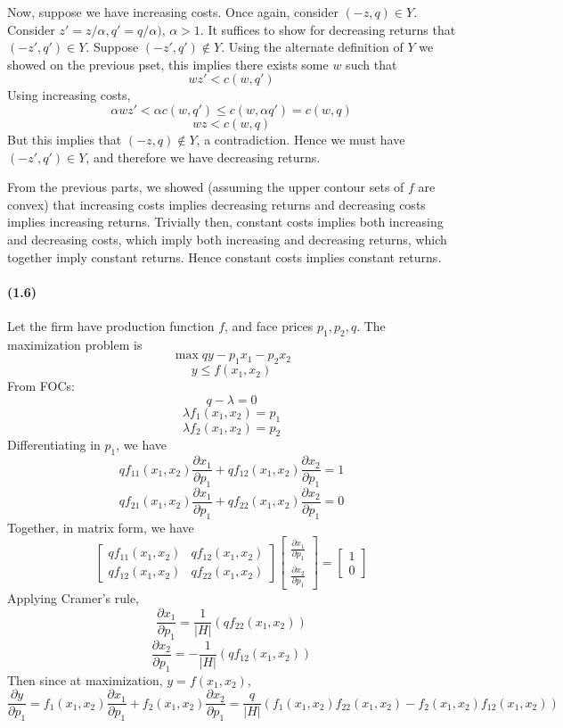 \documentclass[10pt,letter]{article}
\begin{document}
Now, suppose we have increasing costs. Once again, consider $(-z, q) \in Y$. Consider $z' = z/\alpha,  q' = q/\alpha)$, $\alpha > 1$. It suffices to show for decreasing returns that $(-z', q') \in Y$. Suppose $(-z', q') \not \in Y$. Using the alternate definition of $Y$ we showed on the previous pset, this implies there exists some $w$ such that
\[ w z' < c(w, q') \]
Using increasing costs,
\[ \alpha w z' < \alpha c(w, q') \le c(w, \alpha q') = c(w, q) \]
\[ w z < c(w,q) \]
But this implies that $(-z, q) \not \in Y$, a contradiction. Hence we must have $(-z', q' ) \in Y$, and therefore we have decreasing returns.

From the previous parts, we showed (assuming the upper contour sets of $f$ are convex) that increasing costs implies decreasing returns and decreasing costs implies increasing returns. Trivially then, constant costs implies both increasing and decreasing costs, which imply both increasing and decreasing returns, which together imply constant returns. Hence constant costs implies constant returns.
\paragraph{(1.6)}
Let the firm have production function $f$, and face prices $p_1, p_2, q$. The maximization problem is
\[ \max qy - p_1 x_1 - p_2 x_2 \]
\[ y \le f(x_1, x_2) \]
From FOCs:
\[ q - \lambda = 0 \]
\[ \lambda f_1(x_1, x_2) = p_1 \]
\[ \lambda f_2(x_1, x_2) = p_2 \]
Differentiating in $p_1$, we have
\[ qf_{11}(x_1, x_2) \frac{\partial x_1}{\partial p_1} + qf_{12}(x_1, x_2) \frac{\partial x_2}{\partial p_1} = 1 \]
\[ qf_{21}(x_1, x_2) \frac{\partial x_1}{\partial p_1} + qf_{22}(x_1, x_2) \frac{\partial x_2}{\partial p_1} = 0 \]
Together, in matrix form, we have
\[ \begin{bmatrix}
qf_{11}(x_1, x_2) & qf_{12}(x_1, x_2) \\
qf_{12}(x_1, x_2) & qf_{22}(x_1, x_2)
\end{bmatrix} \begin{bmatrix} \frac{\partial x_1}{\partial p_1} \\ \frac{\partial x_2}{\partial p_1}\end{bmatrix} = \begin{bmatrix} 1 \\ 0 \end{bmatrix} \]
Applying Cramer's rule,
\[ \frac{\partial x_1}{\partial p_1} = \frac{1}{|H|} (qf_{22}(x_1, x_2) ) \]
\[ \frac{\partial x_2}{\partial p_1} =  -\frac{1}{|H|} (qf_{12}(x_1, x_2) ) \]
Then since at maximization, $y = f(x_1, x_2)$,
\[ \frac{\partial y}{\partial p_1} = f_1(x_1, x_2)\frac{\partial x_1}{\partial p_1} + f_2(x_1, x_2)\frac{\partial x_2}{\partial p_1} = \frac{q}{|H|} \left(f_1(x_1, x_2)f_{22}(x_1, x_2) - f_2(x_1, x_2)f_{12}(x_1, x_2) \right)  \]
\end{document}
